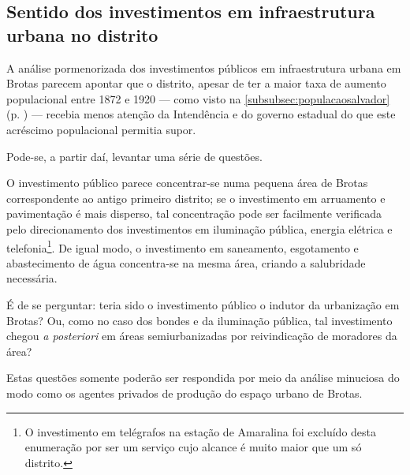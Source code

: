 \subsection{Sentido dos investimentos em infraestrutura urbana no distrito}

A análise pormenorizada dos investimentos públicos em infraestrutura urbana em Brotas parecem apontar que o distrito, apesar de ter a maior taxa de aumento populacional entre 1872 e 1920 --- como visto na \autoref{subsubsec:populacaosalvador} (p. \pageref{subsubsec:populacaosalvador}) --- recebia menos atenção da Intendência e do governo estadual do que este acréscimo populacional permitia supor.

Pode-se, a partir daí, levantar uma série de questões. 

O investimento público parece concentrar-se numa pequena área de Brotas correspondente ao antigo primeiro distrito; se o investimento em arruamento e pavimentação é mais disperso, tal concentração pode ser facilmente verificada pelo direcionamento dos investimentos em iluminação pública, energia elétrica e telefonia\footnote{O investimento em telégrafos na estação de Amaralina foi excluído desta enumeração por ser um serviço cujo alcance é muito maior que um só distrito.}.  De igual modo, o investimento em saneamento, esgotamento e abastecimento de água concentra-se na mesma área, criando a salubridade necessária.

É de se perguntar: teria sido o investimento público o indutor da urbanização em Brotas? Ou, como no caso dos bondes e da iluminação pública, tal investimento chegou \textit{a posteriori} em áreas semiurbanizadas por reivindicação de moradores da área?

Estas questões somente poderão ser respondida por meio da análise minuciosa do modo como os agentes privados de produção do espaço urbano de Brotas.